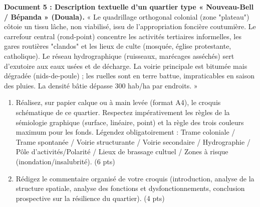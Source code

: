 \documentclass[11pt]{article}
\begin{document}
\begin{exercice}
\textbf{Document 5 : Description textuelle d'un quartier type « Nouveau-Bell / Bépanda » (Douala).}
« Le quadrillage orthogonal colonial (zone "plateau") côtoie un tissu lâche, non viabilisé, issu de l'appropriation foncière coutumière. Le carrefour central (rond-point) concentre les activités tertiaires informelles, les gares routières "clandos" et les lieux de culte (mosquée, église protestante, catholique). Le réseau hydrographique (ruisseaux, marécages asséchés) sert d'exutoire aux eaux usées et de décharge. La voirie principale est bitumée mais dégradée (nids-de-poule) ; les ruelles sont en terre battue, impraticables en saison des pluies. La densité bâtie dépasse 300 hab/ha par endroits. »

\begin{enumerate}
    \item Réalisez, sur papier calque ou à main levée (format A4), le croquis schématique de ce quartier. Respectez impérativement les règles de la sémiologie graphique (surface, linéaire, point) et la règle des trois couleurs maximum pour les fonds. Légendez obligatoirement : Trame coloniale / Trame spontanée / Voirie structurante / Voirie secondaire / Hydrographie / Pôle d'activités/Polarité / Lieux de brassage cultuel / Zones à risque (inondation/insalubrité). (6 pts)
    \item Rédigez le commentaire organisé de votre croquis (introduction, analyse de la structure spatiale, analyse des fonctions et dysfonctionnements, conclusion prospective sur la résilience du quartier). (4 pts)
\end{enumerate}
\end{exercice}
\end{document}
